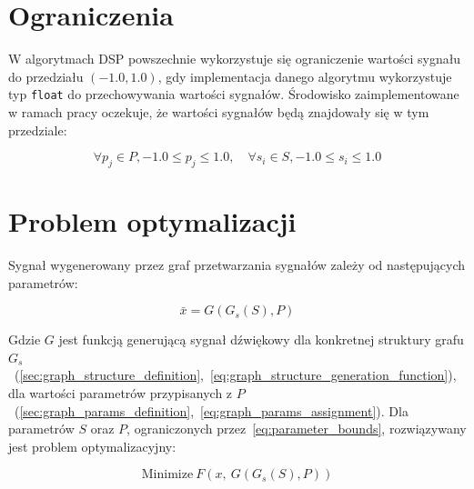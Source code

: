 

\section{Ograniczenia}

W algorytmach DSP powszechnie wykorzystuje się ograniczenie wartości
sygnału do przedziału $(-1.0, 1.0)$, gdy implementacja danego algorytmu wykorzystuje 
typ \texttt{float} do przechowywania wartości sygnałów. Środowisko zaimplementowane
w ramach pracy oczekuje, że wartości sygnałów będą znajdowały się w tym przedziale:

\begin{equation}
  \forall p_j \in P,  -1.0 \leq p_j \leq 1.0, \quad \forall s_i \in S, -1.0 \leq s_i \leq 1.0
  \label{eq:parameter_bounds}
\end{equation}

\section{Problem optymalizacji}

Sygnał wygenerowany przez graf przetwarzania sygnałów zależy od następujących parametrów:

\begin{equation}
  \bar{x} = G(G_s(S), P)
  \label{eq:graph_generated_signal}
\end{equation}

\noindent
Gdzie $G$ jest funkcją generującą sygnał dźwiękowy dla konkretnej struktury grafu
$G_s$~(\ref{sec:graph_structure_definition},~\ref{eq:graph_structure_generation_function}),
dla wartości parametrów przypisanych z
$P$~(\ref{sec:graph_params_definition},~\ref{eq:graph_params_assignment}).
Dla parametrów $S$ oraz $P$, ograniczonych przez~\ref{eq:parameter_bounds},
rozwiązywany jest problem optymalizacyjny:

\begin{equation}
  \text{Minimize}~F(x,~G(G_s(S), P))
  \label{eq:target_function}
\end{equation}

